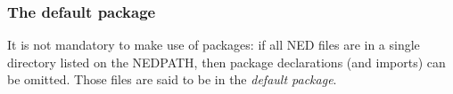 \subsubsection{The default package}

It is not mandatory to make use of packages: if all NED files are in a
single directory listed on the NEDPATH, then package declarations (and
imports) can be omitted. Those files are said to be in the \textit{default
package}.






